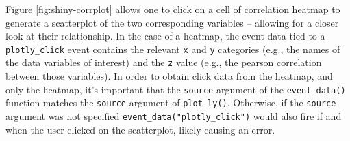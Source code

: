 \documentclass[
  12pt,
]{krantz}
\begin{document}
Figure \ref{fig:shiny-corrplot} allows one to click on a cell of correlation heatmap to generate a scatterplot of the two corresponding variables -- allowing for a closer look at their relationship. In the case of a heatmap, the event data tied to a \texttt{plotly\_click} event contains the relevant \texttt{x} and \texttt{y} categories (e.g., the names of the data variables of interest) and the \texttt{z} value (e.g., the pearson correlation between those variables). In order to obtain click data from the heatmap, and only the heatmap, it's important that the \texttt{source} argument of the \texttt{event\_data()} function matches the \texttt{source} argument of \texttt{plot\_ly()}. Otherwise, if the \texttt{source} argument was not specified \texttt{event\_data("plotly\_click")} would also fire if and when the user clicked on the scatterplot, likely causing an error.
\end{document}
